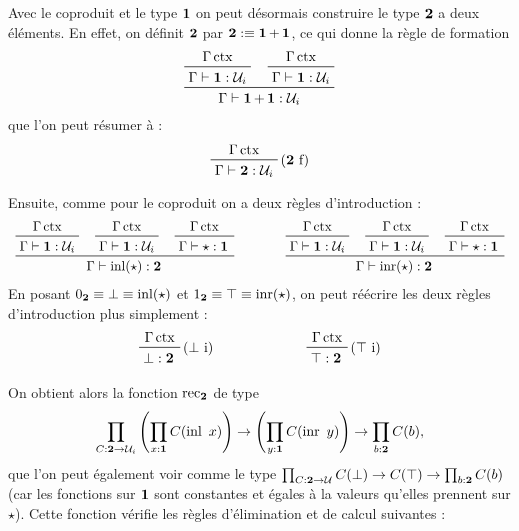 \documentclass[../../rapport.tex]{subfiles}
\begin{document}
  \begin{example}[Le type $\2$]
    \label{ex:type_2}
    Avec le coproduit et le type $\operatorname{\textbf{1}}$ on peut désormais construire le type $\2$ a deux éléments.
    En effet, on définit $\2$ par $\operatorname{\textbf{2}} :\equiv \operatorname{\textbf{1}} + \operatorname{\textbf{1}}$, ce qui donne la règle de formation
    $$
    \prfinterspace=1.2em
    \prftree{\prftree{\Gamma \ctx}{\Gamma \vdash \1 : \U_i}}{\prftree{\Gamma \ctx}{\Gamma \vdash \1 : \U_i}}
      {\Gamma \vdash \1 + \1 : \U_i}
    $$
    que l'on peut résumer à :
    $$
    \prftree[r]{($\2$ f)}{\Gamma \ctx}{\Gamma \vdash \2 : \U_i}
    $$

    Ensuite, comme pour le coproduit on a deux règles d'introduction :
    $$
    \prfinterspace=1.2em
    \begin{array}{cc}
      \prftree{\prftree{\Gamma \ctx}{\Gamma \vdash \1 : \U_i}}
	{\prftree{\Gamma \ctx}{\Gamma \vdash \1 : \U_i}}
	{\prftree{\Gamma \ctx}{\Gamma \vdash \star : \1}}
	{\Gamma \vdash \inl(\star) : \2} \hspace{1cm}
      &\prftree{\prftree{\Gamma \ctx}{\Gamma \vdash \1 : \U_i}}
	{\prftree{\Gamma \ctx}{\Gamma \vdash \1 : \U_i}}
	{\prftree{\Gamma \ctx}{\Gamma \vdash \star : \1}}
	  {\Gamma \vdash \inr(\star) : \2}
    \end{array}
    $$
    En posant $0_{\operatorname{\textbf{2}}} \equiv \bot \equiv \operatorname{inl}(\star)$ et $1_{\operatorname{\textbf{2}}} \equiv \top \equiv \operatorname{inr}(\star)$,
    on peut réécrire les deux règles d'introduction plus simplement :
    $$
    \begin{array}{cc}
      \prftree[r]{($\bot$ i)}{\Gamma \ctx}{\bot : \2} \hspace{2cm}
      & \prftree[r]{($\top$ i)}{\Gamma \ctx}{\top : \2}
    \end{array}
    $$

    On obtient alors la fonction $\operatorname{rec}_{\operatorname{\textbf{2}}}$ de type
    $$\prod_{C : \operatorname{\textbf{2}} \rightarrow \mathcal U_i} \left(\prod_{x:\operatorname{\textbf{1}}} C(\operatorname{inl}\ x)\right) \rightarrow \left(\prod_{y:\operatorname{\textbf{1}}}C(\operatorname{inr}\ y)\right) \rightarrow \prod_{b : \operatorname{\textbf{2}}} C(b),$$
    que l'on peut également voir comme le type $\prod_{C:\operatorname{\textbf{2}} \rightarrow \mathcal U}C(\bot) \rightarrow C(\top) \rightarrow \prod_{b:\operatorname{\textbf{2}}}C(b)$
    (car les fonctions sur $\operatorname{\textbf{1}}$ sont constantes et égales à la valeurs qu'elles prennent sur $\star$).
    Cette fonction vérifie les règles d'élimination et de calcul suivantes :


\end{example}
\end{document}
